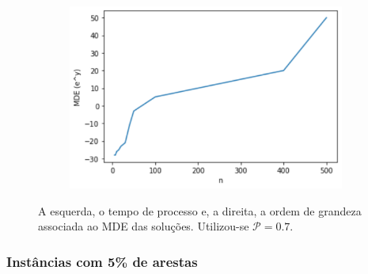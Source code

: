 \documentclass[a4paper,12pt]{article}
\begin{document}
\begin{figure}[H]
\begin{center}
\begin{minipage}{0.45 \linewidth}
				\begin{figure}[H]
					\begin{center}
						\includegraphics[width=1\linewidth]{figures/mdeTriPro1.png}
					\end{center}
					\label{fig:mdeTri}
				\end{figure}
			\end{minipage}
		\end{center}
		\caption{A esquerda, o tempo de processo e, a direita, a ordem de grandeza associada ao MDE das soluções. Utilizou-se $\mathcal{P} = 0.7$.}
		\label{fig:triPri4}
	\end{figure}
	
	\subsubsection*{Instâncias com 5\% de arestas}
	
\end{document}

